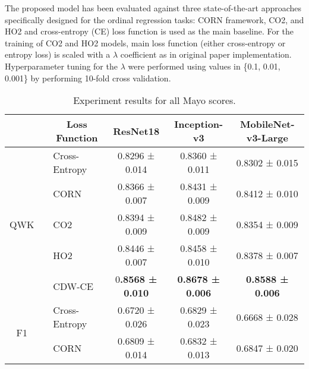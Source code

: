 \documentclass[runningheads]{llncs}
\begin{document}
The proposed model has been evaluated against three state-of-the-art approaches specifically designed for the ordinal regression tasks: CORN framework, CO2, and HO2 and cross-entropy (CE) loss function is used as the main baseline. For the training of CO2 and HO2 models, main loss function (either cross-entropy or entropy loss) is scaled with a $\lambda$ coefficient as in original paper implementation. Hyperparameter tuning for the $\lambda$ were performed using values in \{0.1, 0.01, 0.001\} by performing 10-fold cross validation.

\begin{table}[t!]
\caption{Experiment results for all Mayo scores.}
\label{tab:experiment_results_mayo_scores}
\begin{adjustbox}{center}
\begin{tabular}{cllccc} 
\hline
                          & \multicolumn{1}{c}{} & \multicolumn{1}{c}{\textbf{Loss Function}} & \textbf{ResNet18}       & \textbf{Inception-v3}   & \textbf{MobileNet-v3-Large}  \\ 
\hline
\multirow{5}{*}{QWK}      &                      & Cross-Entropy                              & 0.8296 ± 0.014          & 0.8360 ± 0.011          & 0.8302 ± 0.015               \\
                          &                      & CORN                                       & 0.8366 ± 0.007          & 0.8431 ± 0.009          & 0.8412 ± 0.010               \\
                          &                      & CO2                                        & 0.8394 ± 0.009          & 0.8482 ± 0.009          & 0.8354 ± 0.009               \\
                          &                      & HO2                                        & 0.8446 ± 0.007          & 0.8458 ± 0.010          & 0.8378 ± 0.007               \\
                          &                      & CDW-CE                                     & 0\textbf{.8568 ± 0.010} & \textbf{0.8678 ± 0.006} & \textbf{0.8588 ± 0.006}      \\ 
\hline
\multirow{5}{*}{F1}       &                      & Cross-Entropy                              & 0.6720 ± 0.026          & 0.6829 ± 0.023          & 0.6668 ± 0.028               \\
                          &                      & CORN                                       & 0.6809 ± 0.014          & 0.6832 ± 0.013          & 0.6847 ± 0.020               \\

\end{tabular}
\end{adjustbox}
\end{table}
\end{document}
